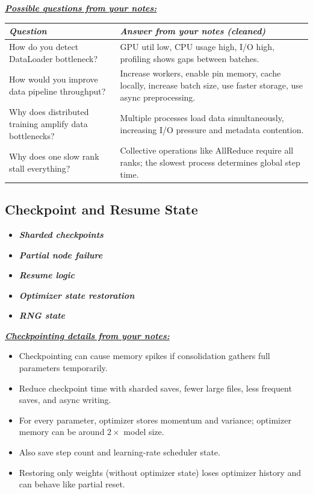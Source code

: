 \documentclass[12pt]{article}
\newcommand{\keysent}[1]{\textbf{\textit{\uline{#1}}}}
\let\origtextbf\textbf
\renewcommand{\textbf}[1]{\origtextbf{\textit{#1}}}
\begin{document}
\keysent{Possible questions from your notes:}\par
{\footnotesize
\begin{tabularx}{\textwidth}{|>{\raggedright\arraybackslash}p{3.4cm}|X|}
\hline
\textbf{Question} & \textbf{Answer from your notes (cleaned)} \\
\hline
How do you detect DataLoader bottleneck? & GPU util low, CPU usage high, I/O high, profiling shows gaps between batches. \\
\hline
How would you improve data pipeline throughput? & Increase workers, enable pin memory, cache locally, increase batch size, use faster storage, use async preprocessing. \\
\hline
Why does distributed training amplify data bottlenecks? & Multiple processes load data simultaneously, increasing I/O pressure and metadata contention. \\
\hline
Why does one slow rank stall everything? & Collective operations like AllReduce require all ranks; the slowest process determines global step time. \\
\hline
\end{tabularx}
}

\subsection{Checkpoint and Resume State}
\begin{itemize}
\item \textbf{Sharded checkpoints}
\item \textbf{Partial node failure}
\item \textbf{Resume logic}
\item \textbf{Optimizer state restoration}
\item \textbf{RNG state}
\end{itemize}

\keysent{Checkpointing details from your notes:}
\begin{itemize}
\item Checkpointing can cause memory spikes if consolidation gathers full parameters temporarily.
\item Reduce checkpoint time with sharded saves, fewer large files, less frequent saves, and async writing.
\item For every parameter, optimizer stores momentum and variance; optimizer memory can be around \(2\times\) model size.
\item Also save step count and learning-rate scheduler state.
\item Restoring only weights (without optimizer state) loses optimizer history and can behave like partial reset.
\end{itemize}
\end{document}
